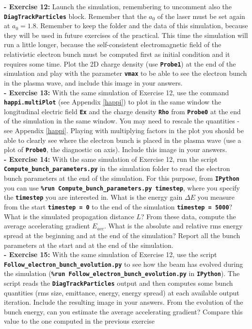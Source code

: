 \documentclass[a4paper,12pt]{extarticle}
\newcommand{\commandline}[1]{\texttt{\textbf{#1}}}
\begin{document}
\textbf{ - Exercise 12:} Launch the simulation, remembering to uncomment also the \commandline{DiagTrackParticles} block. Remember that the $a_0$ of the laser must be set again at $a_0=1.8$.  Remember to keep the folder and the data of this simulation, because they will be used in future exercises of the practical. This time the simulation will run a little longer, because the self-consistent electromagnetic field of the relativistic electron bunch must be computed first as initial condition and it requires some time. Plot the 2D charge density (use \commandline{Probe1}) at the end  of the simulation and play with the parameter \commandline{vmax} to be able to see the electron bunch in the plasma wave, and include this image in your answers.\\

\textbf{ - Exercise 13:} With the same simulation of Exercise 12, use the command \commandline{happi.multiPlot} (see Appendix \ref{happi}) to plot in the same window the longitudinal electric field \commandline{Ex} and the charge density \commandline{Rho} from \commandline{Probe0} at the end of the simulation in the same window. You may need to rescale the quantities - see Appendix \ref{happi}. Playing with multiplying factors in the plot you should be able to clearly see where the electron bunch is placed in the plasma wave (use a plot of \commandline{Probe0}, the diagnostic on axis). Include this image in your answers.\\

\textbf{ - Exercise 14:} With the same simulation of Exercise 12, run the script \commandline{Compute\_bunch\_parameters.py} in the simulation folder to read the electron bunch parameters at the end of the simulation. For this purpose, from \commandline{IPython} you can use \commandline{\%run Compute\_bunch\_parameters.py timestep}, where you specify the \commandline{timestep} you are interested in. What is the energy gain $\Delta E$ you measure from the start \commandline{timestep = 0} to the end of the simulation \commandline{timestep = 5000}? What is the simulated propagation distance $L$? From these data, compute the average accelerating  gradient $E_{acc}$. What is the absolute and relative rms energy spread at the beginning and at the end of the simulation? Report all the bunch parameters at the start and at the end of the simulation.\\

\textbf{ - Exercise 15:} With the same simulation of Exercise 12, use the script
 \commandline{Follow\_electron\_bunch\_evolution.py} to see how the beam has evolved during the simulation (\commandline{\%run Follow\_electron\_bunch\_evolution.py} in \commandline{IPython}).  The script reads the \commandline{DiagTrackParticles} output and then computes some bunch quantities (rms size, emittance, energy, energy spread) at each available output iteration. Include the resulting image in your answers.  From the evolution of the bunch energy, can you estimate the average accelerating gradient? Compare this value to the one computed in the previous exercise\\
\end{document}

